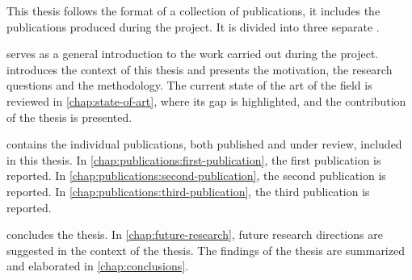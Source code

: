 

This thesis follows the format of a collection of publications, \ie it includes the publications produced during the \phd project.
It is divided into three separate .

 serves as a general introduction to the work carried out during the \phd project.
 introduces the context of this thesis and presents the motivation, the research questions and the methodology.
The current state of the art of the field is reviewed in \cref{chap:state-of-art}, where its gap is highlighted, and the contribution of the thesis is presented.

 contains the individual publications, both published and under review, included in this thesis.
In \cref{chap:publications:first-publication}, the first publication is reported.
In \cref{chap:publications:second-publication}, the second publication is reported.
In \cref{chap:publications:third-publication}, the third publication is reported.

 concludes the thesis.
In \cref{chap:future-research}, future research directions are suggested in the context of the thesis.
The findings of the thesis are summarized and elaborated in \cref{chap:conclusions}.
